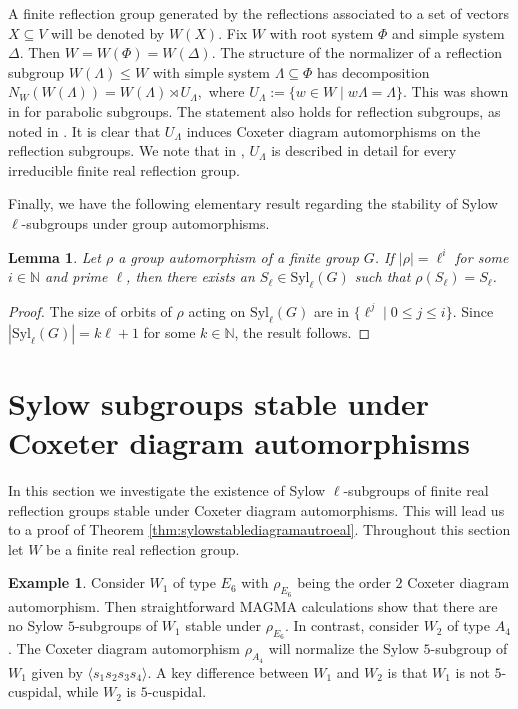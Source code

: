 \documentclass[12pt]{amsart}
\theoremstyle{plain}
\newtheorem{lemma}[theorem]{Lemma}
\theoremstyle{definition}
\numberwithin{equation}{section}
\newtheorem{example}[theorem]{Example}
\newcommand{\N}{\mathbb{N}}
\numberwithin{equation}{section}
\begin{document}
	A finite reflection group generated by the reflections associated to a set of vectors $X\subseteq V$ will be denoted by $W(X)$. Fix $W$ with root system $\Phi$ and simple system $\Delta$. Then $W=W(\Phi)=W(\Delta)$. The structure of the normalizer of a reflection subgroup $W(\Lambda)\leq W$ with simple system $\Lambda\subseteq \Phi$ has decomposition $N_W(W(\Lambda))=W(\Lambda)\rtimes U_\Lambda,$ where $U_\Lambda:=\{w\in W \mid w\Lambda=\Lambda\}$. This was shown in \cite[Corollary 3]{HOWLETT} for parabolic subgroups. The statement also holds for reflection subgroups, as noted in \cite[Remark 3.5]{GHM3}. It is clear that $U_\Lambda$ induces Coxeter diagram automorphisms on the reflection subgroups. We note that in \cite{HOWLETT}, $U_\Lambda$ is described in detail for every irreducible finite real reflection group. 
	
	Finally, we have the following elementary result regarding the stability of Sylow $\ell$-subgroups under group automorphisms.
	
	\begin{lemma}\label{lem:groupautosylow}
		Let $\rho$ a group automorphism of a finite group $G$. If $|\rho|=\ell^i$ for some $i\in\N$ and prime $\ell$, then there exists an $S_\ell\in\text{Syl}_\ell(G)$ such that $\rho(S_\ell)=S_\ell$.
	\end{lemma}
	\begin{proof}
		The size of orbits of $\rho$ acting on $\text{Syl}_\ell(G)$ are in $\{\ell^j\mid  0 \leq j\leq i\}$.  Since $|\text{Syl}_\ell(G)|=k\ell+1$ for some $k\in\N$, the result follows.
	\end{proof}
	
	
	\section{Sylow subgroups stable under Coxeter diagram automorphisms }\label{sylowstableunderauto}
	
	In this section we investigate the existence of Sylow $\ell$-subgroups of finite real reflection groups stable under Coxeter diagram automorphisms. This will lead us to a proof of Theorem \ref{thm:sylowstablediagramautroeal}. Throughout this section let $W$ be a finite real reflection group.
	
	\begin{example}
		Consider $W_1$ of type $E_6$ with $\rho_{E_6}$ being the order $2$ Coxeter diagram automorphism. Then straightforward MAGMA calculations show that there are no Sylow $5$-subgroups of $W_1$ stable under $\rho_{E_6}$. In contrast, consider $W_2$ of type $A_4$. The Coxeter diagram automorphism $\rho_{A_4}$ will normalize the Sylow $5$-subgroup of $W_1$ given by $\langle s_1s_2s_3s_4 \rangle$. A key difference between $W_1$ and $W_2$ is that $W_1$ is not $5$-cuspidal, while $W_2$ is $5$-cuspidal.
	\end{example}
	
\end{document}
